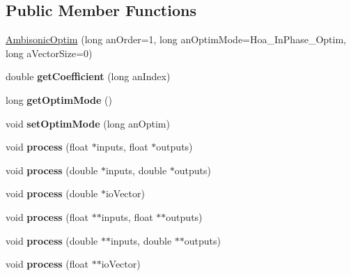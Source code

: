 \subsection*{Public Member Functions}
\begin{DoxyCompactItemize}
\item 
\hyperlink{class_ambisonic_optim_adebe5049c799d83f1c936368cf18f5ed}{Ambisonic\-Optim} (long an\-Order=1, long an\-Optim\-Mode=Hoa\-\_\-\-In\-Phase\-\_\-\-Optim, long a\-Vector\-Size=0)
\item 
\hypertarget{class_ambisonic_optim_aa543ef2e4e399db2b340d9f36aa83581}{double {\bfseries get\-Coefficient} (long an\-Index)}\label{class_ambisonic_optim_aa543ef2e4e399db2b340d9f36aa83581}

\item 
\hypertarget{class_ambisonic_optim_a44b10f58fc4aeb4e8076852faba7fa03}{long {\bfseries get\-Optim\-Mode} ()}\label{class_ambisonic_optim_a44b10f58fc4aeb4e8076852faba7fa03}

\item 
\hypertarget{class_ambisonic_optim_ae991129fc3dd40d4816d5e4aa2835b66}{void {\bfseries set\-Optim\-Mode} (long an\-Optim)}\label{class_ambisonic_optim_ae991129fc3dd40d4816d5e4aa2835b66}

\item 
\hypertarget{class_ambisonic_optim_a02480862ae0df23fc806c43c270a55af}{void {\bfseries process} (float $\ast$inputs, float $\ast$outputs)}\label{class_ambisonic_optim_a02480862ae0df23fc806c43c270a55af}

\item 
\hypertarget{class_ambisonic_optim_a4d45b3ccdb9c35768a66c26ca62ebdf6}{void {\bfseries process} (double $\ast$inputs, double $\ast$outputs)}\label{class_ambisonic_optim_a4d45b3ccdb9c35768a66c26ca62ebdf6}

\item 
\hypertarget{class_ambisonic_optim_af97fbd9de4e98fcb6ce8db3e154e6ed1}{void {\bfseries process} (double $\ast$io\-Vector)}\label{class_ambisonic_optim_af97fbd9de4e98fcb6ce8db3e154e6ed1}

\item 
\hypertarget{class_ambisonic_optim_a989c5278e2846830f03dbaab4ae251b2}{void {\bfseries process} (float $\ast$$\ast$inputs, float $\ast$$\ast$outputs)}\label{class_ambisonic_optim_a989c5278e2846830f03dbaab4ae251b2}

\item 
\hypertarget{class_ambisonic_optim_ac0bb12ba1d6ceee8544442d8458e2c30}{void {\bfseries process} (double $\ast$$\ast$inputs, double $\ast$$\ast$outputs)}\label{class_ambisonic_optim_ac0bb12ba1d6ceee8544442d8458e2c30}

\item 
\hypertarget{class_ambisonic_optim_a33e3ebbfca68d5de3f2d6fc208b71ddf}{void {\bfseries process} (float $\ast$$\ast$io\-Vector)}\label{class_ambisonic_optim_a33e3ebbfca68d5de3f2d6fc208b71ddf}

\end{DoxyCompactItemize}
